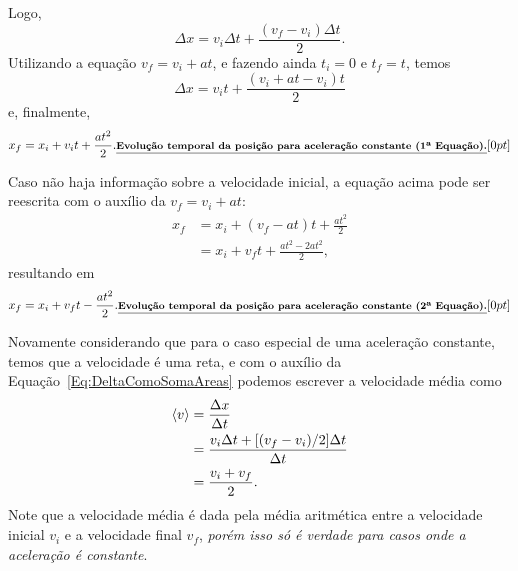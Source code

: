\noindent{}Logo,
\begin{equation}\label{Eq:DeltaComoSomaAreas}
  \Delta x = v_i\Delta t + \frac{(v_f - v_i)\Delta t}{2}.
\end{equation}
%
Utilizando a equação $v_f = v_i + at$, e fazendo ainda $t_i = 0$ e $t_f = t$, temos
\begin{equation}
  \Delta x = v_i t + \frac{(v_i + at - v_i) t}{2}
\end{equation}
%
e, finalmente,
\begin{equation}\label{Eq:XX0V0TAT22}
  x_f = x_i + v_i t +\frac{at^2}{2}.\mathnote{Evolução temporal da posição para aceleração constante (1\textordfeminine~Equação).}
\end{equation}

Caso não haja informação sobre a velocidade inicial, a equação acima pode ser reescrita com o auxílio da $v_f = v_i + at$:
\begin{align}
  x_f &= x_i + (v_f - at) t + \frac{at^2}{2} \\
  &= x_i + v_f t + \frac{at^2 - 2at^2}{2},
\end{align}
%
resultando em
\begin{equation}
  x_f = x_i + v_f t - \frac{at^2}{2}.\mathnote{Evolução temporal da posição para aceleração constante (2\textordfeminine~Equação).}
\end{equation}

%
%
Novamente considerando que para o caso especial de uma aceleração constante, temos que a velocidade é uma reta, e com o auxílio da Equação~\eqref{Eq:DeltaComoSomaAreas} podemos escrever a velocidade média como
\begin{align}
  \left\langle{v}\right\rangle &= \frac{\Delta x}{\Delta t} \\
  &= \frac{v_i \Delta t + [(v_f - v_i)/2] \Delta t}{\Delta t} \\
  &= \frac{v_i + v_f}{2}. \label{Eq:VelMediaComoMedAritParaAcelConst}
\end{align}
%
Note que a velocidade média é dada pela média aritmética entre a velocidade inicial $v_i$ e a velocidade final $v_f$, \emph{porém isso só é verdade para casos onde a aceleração é constante}.


